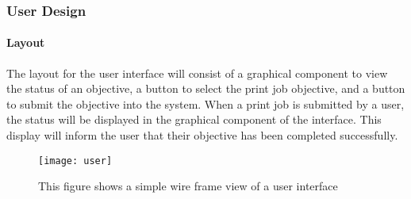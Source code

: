 \subsubsection{User Design}
\paragraph{Layout}
The layout for the user interface will consist of a graphical component to view the status of an objective, a button to select the print job objective, and a button to submit the objective into the system. When a print job is submitted by a user, the status will be displayed in the graphical component of the interface. This display will inform the user that their objective has been completed successfully. 
\begin{figure}[H]
\centering
\texttt{[image: user]}
\captionsetup{justification=centering}
\caption{This figure shows a simple wire frame view of a user interface}
\end{figure}

